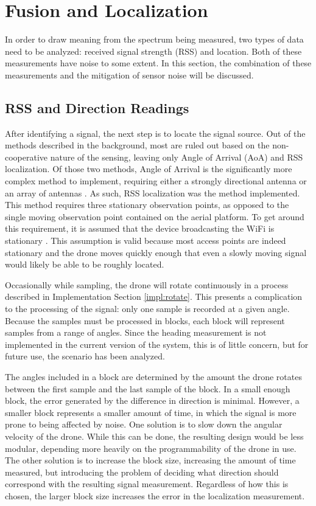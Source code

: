 \section{Fusion and Localization}
In order to draw meaning from the spectrum being measured, two types of data need to be analyzed: received signal strength (RSS) and location. Both of these measurements have noise to some extent. In this section, the combination of these measurements and the mitigation of sensor noise will be discussed. \par  

\subsection{RSS and Direction Readings}
After identifying a signal, the next step is to locate the signal source. Out of the methods described in the background, most are ruled out based on the non-cooperative nature of the sensing, leaving only Angle of Arrival (AoA) and RSS localization. Of those two methods, Angle of Arrival is the significantly more complex method to implement, requiring either a strongly directional antenna or an array of antennas \cite{local_aoa}. As such, RSS localization was the method implemented. This method requires three stationary observation points, as opposed to the single moving observation point contained on the aerial platform. To get around this requirement, it is assumed that the device broadcasting the WiFi is stationary \cite{rss_calc}. This assumption is valid because most access points are indeed stationary and the drone moves quickly enough that even a slowly moving signal would likely be able to be roughly located. \par 
Occasionally while sampling, the drone will rotate continuously in a process described in Implementation Section \ref{impl:rotate}. This presents a complication to the processing of the signal: only one sample is recorded at a given angle. Because the samples must be processed in blocks, each block will represent samples from a range of angles. Since the heading measurement is not implemented in the current version of the system, this is of little concern, but for future use, the scenario has been analyzed. \par
The angles included in a block are determined by the amount the drone rotates between the first sample and the last sample of the block. In a small enough block, the error generated by the difference in direction is minimal. However, a smaller block represents a smaller amount of time, in which the signal is more prone to being affected by noise. One solution is to slow down the angular velocity of the drone. While this can be done, the resulting design would be less modular, depending more heavily on the programmability of the drone in use. The other solution is to increase the block size, increasing the amount of time measured, but introducing the problem of deciding what direction should correspond with the resulting signal measurement. Regardless of how this is chosen, the larger block size increases the error in the localization measurement.\par 
